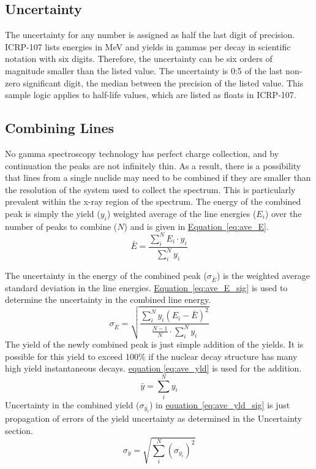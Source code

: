 \documentclass[12pt,report,justified]{SANDreport}
\begin{document}
\subsection{Uncertainty}\label{sec:unc}
The uncertainty for any number is assigned as half the last digit of precision. ICRP-107 lists
energies in MeV and yields in gammas per decay in scientific notation with six digits. Therefore,
the uncertainty can be six orders of magnitude smaller than the listed value. The uncertainty is 0:5
of the last non-zero significant digit, the median between the precision of the listed value. This
sample logic applies to half-life values, which are listed as floats in ICRP-107.

\subsection{Combining Lines}\label{sec:comb_lines}
No gamma spectroscopy technology has perfect charge collection, and by continuation the peaks
are not infinitely thin. As a result, there is a possibility that lines from a single nuclide may need
to be combined if they are smaller than the resolution of the system used to collect the spectrum.
This is particularly prevalent within the x-ray region of the spectrum. The energy of the combined
peak is simply the yield (\(y_i\)) weighted average of the line energies (\(E_i\)) over the number of peaks to
combine (\(N\)) and is given in \hyperref[eq:ave_E]{Equation~\ref{eq:ave_E}}.
\begin{equation}
\bar{E} = \frac{\sum^{N}_{i} E_i \cdot y_i}{\sum^{N}_{i}y_i}
\label{eq:ave_E}
\end{equation}

The uncertainty in the energy of the combined peak (\( \sigma _{\bar{E}}\)) is the weighted average standard deviation
in the line energies. \hyperref[eq:ave_E_sig]{Equation~\ref{eq:ave_E_sig}} is used to determine the uncertainty in the combined line energy.
\[
\sigma_{\bar{E}} = \sqrt{\frac{\sum^{N}_{i} y_i \left( E_i - \bar{E} \right) ^2}{ \frac{N-1}{N} \cdot \sum^{N}_{i} y_i}}
\label{eq:ave_E_sig}
\]
The yield of the newly combined peak is just simple addition of the yields. It is possible for this
yield to exceed 100\% if the nuclear decay structure has many high yield instantaneous decays.
\hyperref[eq:ave_yld]{equation \ref{eq:ave_yld}} is used for the addition.
\[
\bar{y} = \sum^N_i y_i
\label{eq:ave_yld}
\]
Uncertainty in the combined yield (\( \sigma _{\bar{y_i}} \)) in \hyperref[eq:ave_yld_sig]{equation~\ref{eq:ave_yld_sig}} is just propagation of errors of the yield
uncertainty as determined in the Uncertainty section.
\[
\sigma_{\bar{y}} = \sqrt{\sum^N_i \left( \sigma_{y_i} \right) ^2}
\label{eq:ave_yld_sig}
\]
\end{document}
